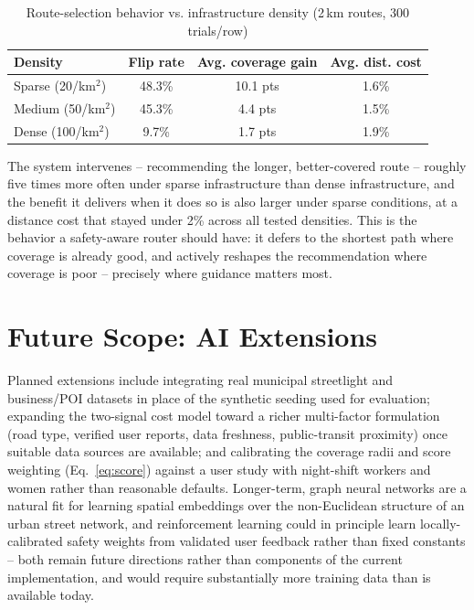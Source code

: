 \documentclass[conference]{IEEEtran}
\begin{document}
\begin{table}[h]
\caption{Route-selection behavior vs. infrastructure density (2\,km routes, 300 trials/row)}
\label{tab:tradeoff}
\centering
\begin{tabular}{@{}lccc@{}}
\toprule
\textbf{Density} & \textbf{Flip rate} & \textbf{Avg. coverage gain} & \textbf{Avg. dist. cost} \\
\midrule
Sparse (20/km$^2$) & 48.3\% & 10.1 pts & 1.6\% \\
Medium (50/km$^2$) & 45.3\% & 4.4 pts & 1.5\% \\
Dense (100/km$^2$) & 9.7\% & 1.7 pts & 1.9\% \\
\bottomrule
\end{tabular}
\end{table}

The system intervenes -- recommending the longer, better-covered route -- roughly five times more often under sparse infrastructure than dense infrastructure, and the benefit it delivers when it does so is also larger under sparse conditions, at a distance cost that stayed under 2\% across all tested densities. This is the behavior a safety-aware router should have: it defers to the shortest path where coverage is already good, and actively reshapes the recommendation where coverage is poor -- precisely where guidance matters most.

\section{Future Scope: AI Extensions}
\label{sec:future}

Planned extensions include integrating real municipal streetlight and business/POI datasets in place of the synthetic seeding used for evaluation; expanding the two-signal cost model toward a richer multi-factor formulation (road type, verified user reports, data freshness, public-transit proximity) once suitable data sources are available; and calibrating the coverage radii and score weighting (Eq.~\eqref{eq:score}) against a user study with night-shift workers and women rather than reasonable defaults. Longer-term, graph neural networks are a natural fit for learning spatial embeddings over the non-Euclidean structure of an urban street network, and reinforcement learning could in principle learn locally-calibrated safety weights from validated user feedback rather than fixed constants -- both remain future directions rather than components of the current implementation, and would require substantially more training data than is available today.
\end{document}
